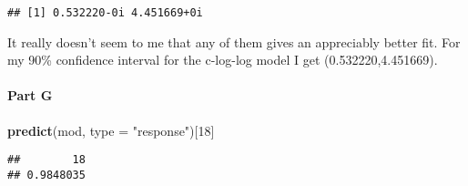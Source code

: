 \documentclass[
]{article}
\newenvironment{Shaded}{\begin{snugshade}}{\end{snugshade}}
\newcommand{\DataTypeTok}[1]{\textcolor[rgb]{0.13,0.29,0.53}{#1}}
\newcommand{\DecValTok}[1]{\textcolor[rgb]{0.00,0.00,0.81}{#1}}
\newcommand{\FloatTok}[1]{\textcolor[rgb]{0.00,0.00,0.81}{#1}}
\newcommand{\KeywordTok}[1]{\textcolor[rgb]{0.13,0.29,0.53}{\textbf{#1}}}
\newcommand{\NormalTok}[1]{#1}
\newcommand{\OperatorTok}[1]{\textcolor[rgb]{0.81,0.36,0.00}{\textbf{#1}}}
\newcommand{\StringTok}[1]{\textcolor[rgb]{0.31,0.60,0.02}{#1}}
\begin{document}
\begin{Shaded}
\end{Shaded}

\begin{verbatim}
## [1] 0.532220-0i 4.451669+0i
\end{verbatim}

It really doesn't seem to me that any of them gives an appreciably
better fit. For my 90\% confidence interval for the c-log-log model I
get (0.532220,4.451669).

\hypertarget{part-g}{%
\paragraph{Part G}\label{part-g}}

\begin{Shaded}
\begin{Highlighting}[]
\KeywordTok{predict}\NormalTok{(mod, }\DataTypeTok{type =} \StringTok{"response"}\NormalTok{)[}\DecValTok{18}\NormalTok{]}
\end{Highlighting}
\end{Shaded}

\begin{verbatim}
##        18 
## 0.9848035
\end{verbatim}
\end{document}
